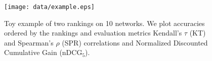 
\begin{figure}
    \centering
    \texttt{[image: data/example.eps]}
    \caption{Toy example of two rankings on 10 networks. We plot accuracies ordered by the rankings and evaluation metrics Kendall's $\tau$ (KT) and Spearman's $\rho$ (SPR) correlations and Normalized Discounted Cumulative Gain ($\text{nDCG}_{5}$). \vspace{-15pt}}
    \label{fig:toy_example_raking}
\end{figure}